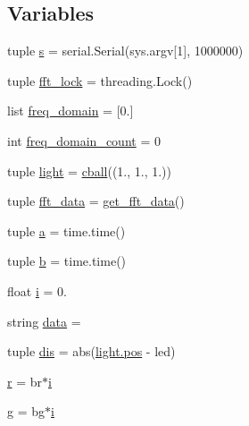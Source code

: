 \subsection*{Variables}
\begin{DoxyCompactItemize}
\item 
tuple \hyperlink{namespacelampa__searchlight_ad70257e6ddb7843ea7aed97ce014b04d}{s} = serial.\+Serial(sys.\+argv\mbox{[}1\mbox{]}, 1000000)
\item 
tuple \hyperlink{namespacelampa__searchlight_a5cceb9bdddb36c29e04c12417ef9fae6}{fft\+\_\+lock} = threading.\+Lock()
\item 
list \hyperlink{namespacelampa__searchlight_a6daeccd8a70d973ec7333af4c9133798}{freq\+\_\+domain} = \mbox{[}0.\mbox{]}
\item 
int \hyperlink{namespacelampa__searchlight_a894179ba51559cacb273879456b30c57}{freq\+\_\+domain\+\_\+count} = 0
\item 
tuple \hyperlink{namespacelampa__searchlight_a362df79c6f5d43093b80348f0c33870b}{light} = \hyperlink{classlampa__searchlight_1_1cball}{cball}((1., 1., 1.))
\item 
tuple \hyperlink{namespacelampa__searchlight_ad9d51346fe2599b20e8e4918dc84d244}{fft\+\_\+data} = \hyperlink{namespacelampa__searchlight_a28ff2343690d6bbf0fba90a140841c57}{get\+\_\+fft\+\_\+data}()
\item 
tuple \hyperlink{namespacelampa__searchlight_a85205193fa9ba66c8f52ef135f489c4b}{a} = time.\+time()
\item 
tuple \hyperlink{namespacelampa__searchlight_a9299265ca5dfc9b51547c8e50db100af}{b} = time.\+time()
\item 
float \hyperlink{namespacelampa__searchlight_a881b6104fe08478fb089cbccc8114d08}{i} = 0.
\item 
string \hyperlink{namespacelampa__searchlight_ac6bef964c5c2cbd736435d7b2ad29ed5}{data} = \textquotesingle{}\textquotesingle{}
\item 
tuple \hyperlink{namespacelampa__searchlight_ad8ff5999e3e1aa35feab8e317f2512dd}{dis} = abs(\hyperlink{sampling_8c_a1910d262855b71da353ed0d07a6c7823}{light.\+pos} -\/ led)
\item 
\hyperlink{namespacelampa__searchlight_aa8857984682eb8ddde904cdd002b8229}{r} = br$\ast$\hyperlink{namespacelampa__searchlight_a881b6104fe08478fb089cbccc8114d08}{i}
\item 
\hyperlink{namespacelampa__searchlight_aebfab5fcf0349602cb745b1796b817e6}{g} = bg$\ast$\hyperlink{namespacelampa__searchlight_a881b6104fe08478fb089cbccc8114d08}{i}
\end{DoxyCompactItemize}


